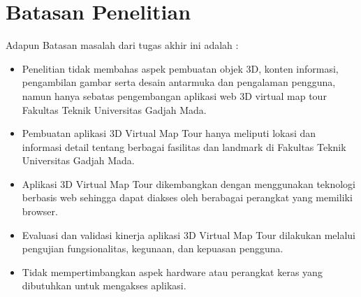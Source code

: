 		


\section{Batasan Penelitian}

Adapun Batasan masalah dari tugas akhir ini adalah :

\begin{itemize}
\item Penelitian tidak membahas aspek pembuatan objek 3D, konten informasi, pengambilan gambar serta desain antarmuka dan pengalaman pengguna, namun hanya sebatas pengembangan aplikasi web 3D virtual map tour Fakultas Teknik Universitas Gadjah Mada.
\item Pembuatan aplikasi 3D Virtual Map Tour hanya meliputi lokasi dan informasi detail tentang berbagai fasilitas dan landmark di Fakultas Teknik Universitas Gadjah Mada.
\item Aplikasi 3D Virtual Map Tour dikembangkan dengan menggunakan teknologi berbasis web sehingga dapat diakses oleh berabagai perangkat yang memiliki browser.
\item Evaluasi dan validasi kinerja aplikasi 3D Virtual Map Tour dilakukan melalui pengujian fungsionalitas, kegunaan, dan kepuasan pengguna.
\item Tidak mempertimbangkan aspek hardware atau perangkat keras yang dibutuhkan untuk mengakses aplikasi.
\end{itemize}

